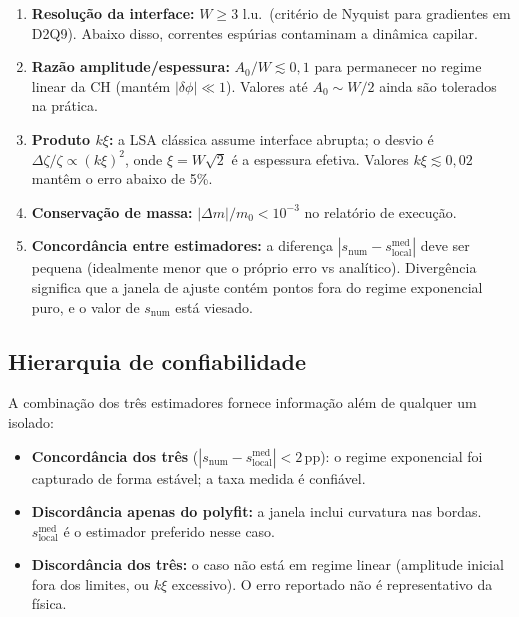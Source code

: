 \documentclass[11pt,a4paper]{article}
\begin{document}
\begin{enumerate}
    \item \textbf{Resolução da interface:} $W \geq 3$ l.u.\ (critério de
    Nyquist para gradientes em D2Q9). Abaixo disso, correntes espúrias
    contaminam a dinâmica capilar.

    \item \textbf{Razão amplitude/espessura:} $A_0/W \lesssim 0{,}1$ para
    permanecer no regime linear da CH (mantém $|\delta\phi| \ll 1$).
    Valores até $A_0 \sim W/2$ ainda são tolerados na prática.

    \item \textbf{Produto $k\xi$:} a LSA clássica assume interface abrupta;
    o desvio é $\Delta\zeta/\zeta \propto (k\xi)^2$, onde
    $\xi = W\sqrt{2}$ é a espessura efetiva. Valores $k\xi \lesssim 0{,}02$
    mantêm o erro abaixo de 5\%.

    \item \textbf{Conservação de massa:} $|\Delta m|/m_0 < 10^{-3}$ no
    relatório de execução.

    \item \textbf{Concordância entre estimadores:} a diferença
    $|s_{\mathrm{num}} - s_{\mathrm{local}}^{\mathrm{med}}|$ deve ser
    pequena (idealmente menor que o próprio erro vs analítico). Divergência
    significa que a janela de ajuste contém pontos fora do regime
    exponencial puro, e o valor de $s_{\mathrm{num}}$ está viesado.
\end{enumerate}

\subsection{Hierarquia de confiabilidade}

A combinação dos três estimadores fornece informação além de qualquer
um isolado:

\begin{itemize}
    \item \textbf{Concordância dos três} ($|s_{\mathrm{num}}-s_{\mathrm{local}}^{\mathrm{med}}| < 2\,\mathrm{pp}$):
    o regime exponencial foi capturado de forma estável; a taxa medida é
    confiável.

    \item \textbf{Discordância apenas do polyfit:} a janela inclui
    curvatura nas bordas. $s_{\mathrm{local}}^{\mathrm{med}}$ é o
    estimador preferido nesse caso.

    \item \textbf{Discordância dos três:} o caso não está em regime linear
    (amplitude inicial fora dos limites, ou $k\xi$ excessivo). O erro
    reportado não é representativo da física.
\end{itemize}
\end{document}
